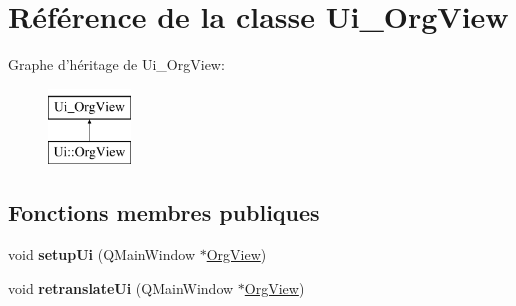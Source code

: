 \hypertarget{class_ui___org_view}{\section{Référence de la classe Ui\-\_\-\-Org\-View}
\label{class_ui___org_view}
}
Graphe d'héritage de Ui\-\_\-\-Org\-View\-:\begin{figure}[H]
\begin{center}
\leavevmode
\includegraphics[height=2.000000cm]{class_ui___org_view}
\end{center}
\end{figure}
\subsection*{Fonctions membres publiques}
\begin{DoxyCompactItemize}
\item 
\hypertarget{class_ui___org_view_a19e8f7a9520c4d8aa55dcf3d2e834cc0}{void {\bfseries setup\-Ui} (Q\-Main\-Window $\ast$\hyperlink{class_org_view}{Org\-View})}\label{class_ui___org_view_a19e8f7a9520c4d8aa55dcf3d2e834cc0}

\item 
\hypertarget{class_ui___org_view_aae8a21e7f58f6f9dd7d8c63bb37e1ee6}{void {\bfseries retranslate\-Ui} (Q\-Main\-Window $\ast$\hyperlink{class_org_view}{Org\-View})}\label{class_ui___org_view_aae8a21e7f58f6f9dd7d8c63bb37e1ee6}

\end{DoxyCompactItemize}
